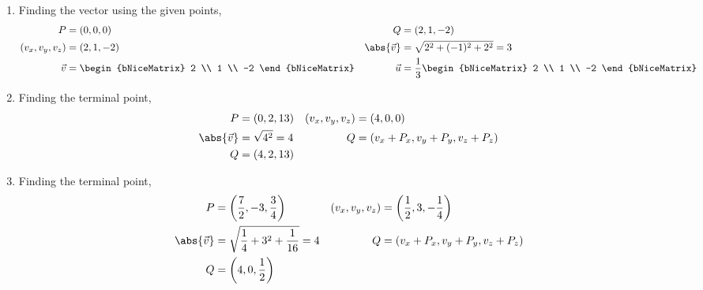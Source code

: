 \begin{enumerate}
    \item Finding the vector using the given points,
          \begin{align}
              P                     & = (0, 0, 0)                      &
              Q                     & = (2, 1, -2)                       \\
              (v_x, v_y, v_z)       & = (2, 1, -2)                     &
              \abs{ \vec{v} } & = \sqrt{2^2 + (-1)^2 + 2^2}
              = 3                                                        \\
              \vec{v}               & = \begin{bNiceMatrix}
                                            2 \\ 1 \\ -2
                                        \end{bNiceMatrix}            &
              \vec{u}               & = \frac{1}{3}\begin{bNiceMatrix}
                                                       2 \\ 1 \\ -2
                                                   \end{bNiceMatrix}
          \end{align}

    \item Finding the terminal point,
          \begin{align}
              P                     & = (0, 2, 13)                        &
              (v_x, v_y, v_z)       & = (4, 0, 0)                           \\
              \abs{ \vec{v} } & = \sqrt{4^2} =  4                   &
              Q                     & = (v_x + P_x, v_y + P_y, v_z + P_z)   \\
              Q                     & = (4, 2, 13)
          \end{align}

    \item Finding the terminal point,
          \begin{align}
              P                     & = \left(\frac{7}{2}, -3, \frac{3}{4}\right) &
              (v_x, v_y, v_z)       & = \left(\frac{1}{2}, 3, -\frac{1}{4}\right)   \\
              \abs{ \vec{v} } & = \sqrt{\frac{1}{4} + 3^2 + \frac{1}{16}}
              =  4                  &
              Q                     & = (v_x + P_x, v_y + P_y, v_z + P_z)           \\
              Q                     & = \left(4, 0, \frac{1}{2}\right)
          \end{align}


\end{enumerate}
